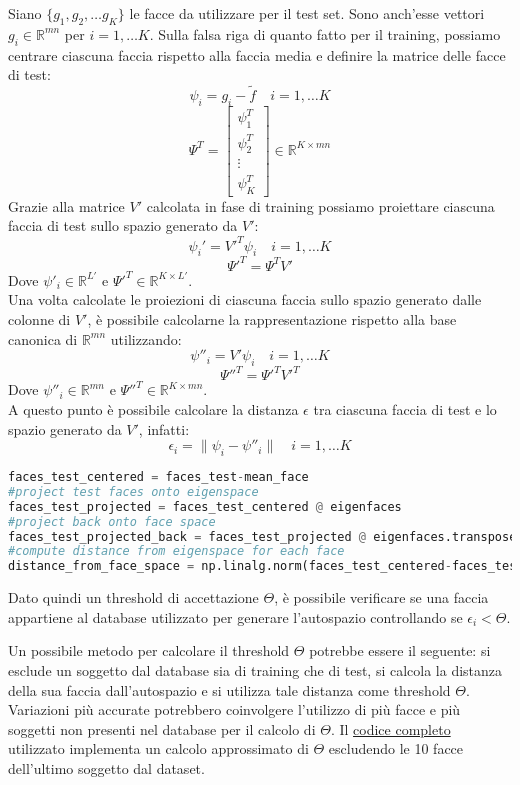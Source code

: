 Siano \(\{g_1, g_2, \dots g_K\}\) le facce da utilizzare per il test set. Sono anch'esse vettori \( g_i \in \mathbb{R}^{mn}\) per \(i = 1, \dots K\). Sulla falsa riga di quanto fatto per il training, possiamo centrare ciascuna faccia rispetto alla faccia media e definire la matrice delle facce di test:
\[
\psi_i = g_i - \tilde{f} \quad i = 1,\dots K    
\]
\[\Psi^T = \begin{bmatrix}
    \psi_1^T \\
    \psi_2^T \\
    \vdots \\
    \psi_K^T
\end{bmatrix} \in \mathbb{R}^{K \times mn}
    \]
Grazie alla matrice \(V'\) calcolata in fase di training possiamo proiettare ciascuna faccia di test sullo spazio generato da \(V'\):
\[
\psi_i' = V'^T \psi_i \quad i = 1,\dots K
\]
\[
    \Psi'^T = \Psi^T V'
\]
Dove \(\psi'_i \in \mathbb{R}^{L'}\) e \(\Psi'^T \in \mathbb{R}^{K \times L'}\). \\
Una volta calcolate le proiezioni di ciascuna faccia sullo spazio generato dalle colonne di \(V'\), è possibile calcolarne la rappresentazione  rispetto alla base canonica di \(\mathbb{R}^{mn}\) utilizzando:
\[
\psi''_i = V' \psi_i \quad i=1, \dots K    
\]
\[
\Psi''^T = \Psi'^T V'^T    
\]
Dove \(\psi''_i \in \mathbb{R}^{mn}\) e \(\Psi''^T \in \mathbb{R}^{K \times mn}\). \\
A questo punto è possibile calcolare la distanza \(\epsilon\) tra ciascuna faccia di test e lo spazio generato da \(V'\), infatti:
\[
\epsilon_i = \| \psi_i - \psi''_i \| \quad i = 1,\dots K     
\]
\begin{lstlisting}[language=Python]
faces_test_centered = faces_test-mean_face
#project test faces onto eigenspace
faces_test_projected = faces_test_centered @ eigenfaces 
#project back onto face space
faces_test_projected_back = faces_test_projected @ eigenfaces.transpose() 
#compute distance from eigenspace for each face
distance_from_face_space = np.linalg.norm(faces_test_centered-faces_test_projected_back, axis=1) 
\end{lstlisting}
Dato quindi un threshold di accettazione \(\Theta\), è possibile verificare se una faccia appartiene al database utilizzato per generare l'autospazio controllando se \(\epsilon_i < \Theta\).
\newpage
\begin{mdframed}
    Un possibile metodo per calcolare il threshold \(\Theta\) potrebbe essere il seguente: si esclude un soggetto dal database sia di training che di test, si calcola la distanza della sua faccia dall'autospazio e si utilizza tale distanza come threshold \(\Theta\). Variazioni più accurate potrebbero coinvolgere l'utilizzo di più facce e più soggetti non presenti nel database per il calcolo di \(\Theta\). Il \href{https://github.com/giulionenna/Facial_Recognition/blob/main/facial_recognition.py}{codice completo} utilizzato implementa un calcolo approssimato di \(\Theta\) escludendo le 10 facce dell'ultimo soggetto dal dataset.
\end{mdframed}
